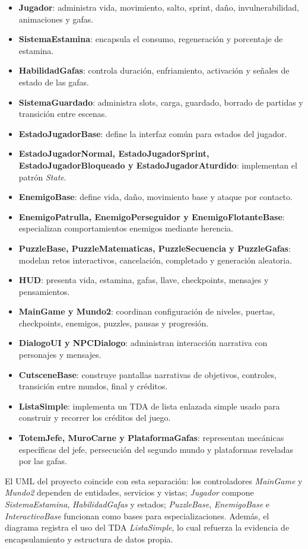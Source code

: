\documentclass[conference]{IEEEtran}
\begin{document}
\begin{itemize}
    \item \textbf{Jugador}: administra vida, movimiento, salto, sprint, daño, invulnerabilidad, animaciones y gafas.
    \item \textbf{SistemaEstamina}: encapsula el consumo, regeneración y porcentaje de estamina.
    \item \textbf{HabilidadGafas}: controla duración, enfriamiento, activación y señales de estado de las gafas.
    \item \textbf{SistemaGuardado}: administra slots, carga, guardado, borrado de partidas y transición entre escenas.
    \item \textbf{EstadoJugadorBase}: define la interfaz común para estados del jugador.
    \item \textbf{EstadoJugadorNormal, EstadoJugadorSprint, EstadoJugadorBloqueado y EstadoJugadorAturdido}: implementan el patrón \textit{State}.
    \item \textbf{EnemigoBase}: define vida, daño, movimiento base y ataque por contacto.
    \item \textbf{EnemigoPatrulla, EnemigoPerseguidor y EnemigoFlotanteBase}: especializan comportamientos enemigos mediante herencia.
    \item \textbf{PuzzleBase, PuzzleMatematicas, PuzzleSecuencia y PuzzleGafas}: modelan retos interactivos, cancelación, completado y generación aleatoria.
    \item \textbf{HUD}: presenta vida, estamina, gafas, llave, checkpoints, mensajes y pensamientos.
    \item \textbf{MainGame y Mundo2}: coordinan configuración de niveles, puertas, checkpoints, enemigos, puzzles, pausas y progresión.
    \item \textbf{DialogoUI y NPCDialogo}: administran interacción narrativa con personajes y mensajes.
    \item \textbf{CutsceneBase}: construye pantallas narrativas de objetivos, controles, transición entre mundos, final y créditos.
    \item \textbf{ListaSimple}: implementa un TDA de lista enlazada simple usado para construir y recorrer los créditos del juego.
    \item \textbf{TotemJefe, MuroCarne y PlataformaGafas}: representan mecánicas específicas del jefe, persecución del segundo mundo y plataformas reveladas por las gafas.
\end{itemize}

El UML del proyecto coincide con esta separación: los controladores \textit{MainGame} y \textit{Mundo2} dependen de entidades, servicios y vistas; \textit{Jugador} compone \textit{SistemaEstamina}, \textit{HabilidadGafas} y estados; \textit{PuzzleBase}, \textit{EnemigoBase} e \textit{InteractivoBase} funcionan como bases para especializaciones. Además, el diagrama registra el uso del TDA \textit{ListaSimple}, lo cual refuerza la evidencia de encapsulamiento y estructura de datos propia.
\end{document}
